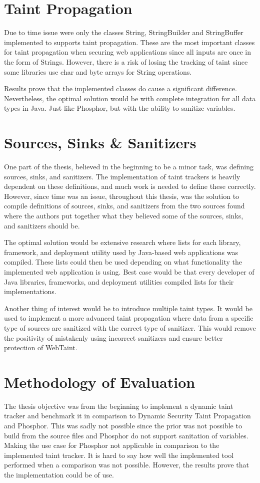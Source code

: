 \section{Taint Propagation}
\label{propagation}
Due to time issue were only the classes String, StringBuilder and StringBuffer implemented to supports taint propagation. These are the most important classes for taint propagation when securing web applications since all inputs are once in the form of Strings. However, there is a risk of losing the tracking of taint since some libraries use char and byte arrays for String operations.

Results prove that the implemented classes do cause a significant difference. Nevertheless, the optimal solution would be with complete integration for all data types in Java. Just like Phosphor, but with the ability to sanitize variables.



\section{Sources, Sinks \& Sanitizers}
\label{sss}
One part of the thesis, believed in the beginning to be a minor task, was defining sources, sinks, and sanitizers. The implementation of taint trackers is heavily dependent on these definitions, and much work is needed to define these correctly. However, since time was an issue, throughout this thesis, was the solution to compile definitions of sources, sinks, and sanitizers from the two sources found where the authors put together what they believed some of the sources, sinks, and sanitizers should be.

The optimal solution would be extensive research where lists for each library, framework, and deployment utility used by Java-based web applications was compiled. These lists could then be used depending on what functionality the implemented web application is using. Best case would be that every developer of Java libraries, frameworks, and deployment utilities compiled lists for their implementations.

Another thing of interest would be to introduce multiple taint types. It would be used to implement a more advanced taint propagation where data from a specific type of sources are sanitized with the correct type of sanitizer. This would remove the positivity of mistakenly using incorrect sanitizers and ensure better protection of WebTaint.



\section{Methodology of Evaluation}
\label{methev}
The thesis objective was from the beginning to implement a dynamic taint tracker and benchmark it in comparison to Dynamic Security Taint Propagation and Phosphor. This was sadly not possible since the prior was not possible to build from the source files and Phosphor do not support sanitation of variables. Making the use case for Phosphor not applicable in comparison to the implemented taint tracker. It is hard to say how well the implemented tool performed when a comparison was not possible. However, the results prove that the implementation could be of use.
